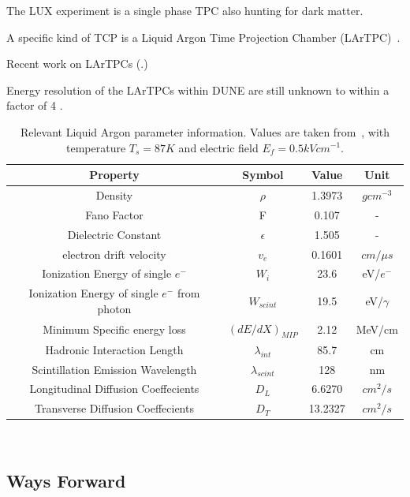 The LUX experiment is a single phase TPC also hunting for dark matter.

A specific kind of TCP is a Liquid Argon Time Projection Chamber (LArTPC)~\citep{rubbia1977liquid}.

Recent work on LArTPCs (\citep{ArgoNeuT_PhysRevD.99.012002, MicroBooNE_Acciarri_2017, LArIAT_Acciarri_2020}.)

Energy resolution of the LArTPCs within DUNE are still unknown to within a factor of 4 \citep{lartpc_energy_resolution:PhysRevD.99.036009}.

\begin{table}
  \begin{center}
    \begin{tabular}{||c c c c||}
 \hline
      Property & Symbol & Value & Unit \\
 \hline\hline
      Density & $\rho$ &  1.3973 & $g cm^{-3}$ \\
      Fano Factor & F & 0.107 & - \\
      Dielectric Constant & $\epsilon$ & 1.505 & - \\
      electron drift velocity & $v_{e}$ & 0.1601 & $\unit{cm/\mu s}$ \\
      Ionization Energy of single $e^{-}$ & $W_{i}$ & 23.6 & eV/$e^{-}$ \\
      Ionization Energy of single $e^{-}$ from photon & $W_{scint}$ & 19.5 & eV/$\gamma$ \\
      Minimum Specific energy loss & $(dE/dX)_{MIP}$ & 2.12 & MeV/cm \\
      Hadronic Interaction Length & $\lambda_{int}$ &85.7 & cm \\
      Scintillation Emission Wavelength & $\lambda_{scint}$ & 128 & nm \\
      Longitudinal Diffusion Coeffecients & $D_{L}$ & 6.6270 & $cm^{2}/s$ \\
      Transverse Diffusion Coeffecients & $D_{T}$ & 13.2327 & $cm^{2}/s$ \\
 \hline
    \end{tabular}
    \caption{Relevant Liquid Argon parameter information. Values are taken from~\citep{lardata_lbnl}, with temperature $T_{s} = 87 K$ and electric field $E_{f} = 0.5 kV cm^{-1}$.}
  \end{center}
\end{table}~\label{tab:lar_prop}

\subsection{Ways Forward}

